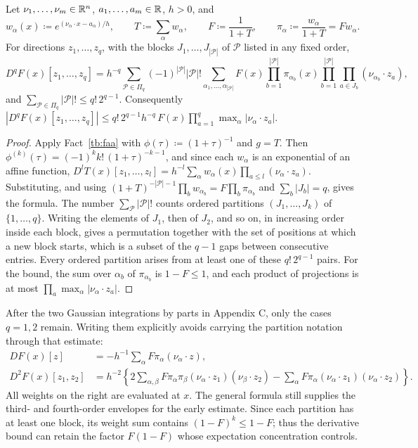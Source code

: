 \begin{fact}\label{tb:logistic}
Let \(\nu_1,\ldots,\nu_m\in\mathbb R^n\), \(a_1,\ldots,a_m\in\mathbb R\), \(h>0\), and
\[
 w_\alpha(x)\coloneqq e^{(\nu_\alpha\cdot x-a_\alpha)/h},\qquad
 T\coloneqq \sum_\alpha w_\alpha,\qquad
 F\coloneqq \frac1{1+T},\qquad
 \pi_\alpha\coloneqq \frac{w_\alpha}{1+T}=Fw_\alpha .
\]
For directions \(z_1,\ldots,z_q\), with the blocks \(J_1,\ldots,J_{|\mathcal P|}\)
of \(\mathcal P\) listed in any fixed order,
\[
 D^qF(x)[z_1,\ldots,z_q]
 =h^{-q}\sum_{\mathcal P\in\Pi_q}(-1)^{|\mathcal P|}|\mathcal P|!
 \sum_{\alpha_1,\ldots,\alpha_{|\mathcal P|}}
 F(x)\prod_{b=1}^{|\mathcal P|}\pi_{\alpha_b}(x)
 \prod_{b=1}^{|\mathcal P|}\prod_{a\in J_b}(\nu_{\alpha_b}\cdot z_a),
\]
and \(\sum_{\mathcal P\in\Pi_q}|\mathcal P|!\le q!\,2^{q-1}\). Consequently
\(|D^qF(x)[z_1,\ldots,z_q]|\le q!\,2^{q-1}h^{-q}\,F(x)\prod_{a=1}^q
\max_\alpha|\nu_\alpha\cdot z_a|\).
\end{fact}

\begin{proof}
Apply Fact~\ref{tb:faa} with \(\phi(\tau)\coloneqq (1+\tau)^{-1}\) and \(g=T\). Then
\(\phi^{(k)}(\tau)=(-1)^kk!\,(1+\tau)^{-k-1}\), and since each \(w_\alpha\) is
an exponential of an affine function,
\(D^lT(x)[z_1,\ldots,z_l]=h^{-l}\sum_\alpha w_\alpha(x)\prod_{a\le l}
(\nu_\alpha\cdot z_a)\). Substituting, and using
\((1+T)^{-|\mathcal P|-1}\prod_bw_{\alpha_b}=F\prod_b\pi_{\alpha_b}\) and
\(\sum_b|J_b|=q\), gives the formula. The number
\(\sum_{\mathcal P}|\mathcal P|!\) counts ordered partitions
\((J_1,\ldots,J_k)\) of \(\{1,\ldots,q\}\). Writing the elements of
\(J_1\), then of \(J_2\), and so on, in increasing order inside each block,
gives a permutation together with the set of positions at which a new block
starts, which is a subset of the \(q-1\) gaps between consecutive entries.
Every ordered partition arises from at least one of these
\(q!\,2^{q-1}\) pairs. For the bound, the sum over \(\alpha_b\) of
\(\pi_{\alpha_b}\) is \(1-F\le1\), and each product of projections is
at most \(\prod_a\max_\alpha|\nu_\alpha\cdot z_a|\).
\end{proof}

After the two Gaussian integrations by parts in Appendix C, only
the cases \(q=1,2\) remain. Writing them explicitly avoids carrying
the partition notation through that estimate:
\begin{align*}
 DF(x)[z]&=-h^{-1}\sum_\alpha F\pi_\alpha(\nu_\alpha\cdot z),\\
 D^2F(x)[z_1,z_2]
 &=h^{-2}\left\{2\sum_{\alpha,\beta}F\pi_\alpha\pi_\beta
       (\nu_\alpha\cdot z_1)(\nu_\beta\cdot z_2)
       -\sum_\alpha F\pi_\alpha
       (\nu_\alpha\cdot z_1)(\nu_\alpha\cdot z_2)\right\}.
\end{align*}
All weights on the right are evaluated at \(x\). The general formula
still supplies the third- and fourth-order envelopes for the early
estimate. Since each partition has at least one block, its weight
sum contains \((1-F)^k\le1-F\); thus the derivative bound can retain
the factor \(F(1-F)\) whose expectation concentration controls.


